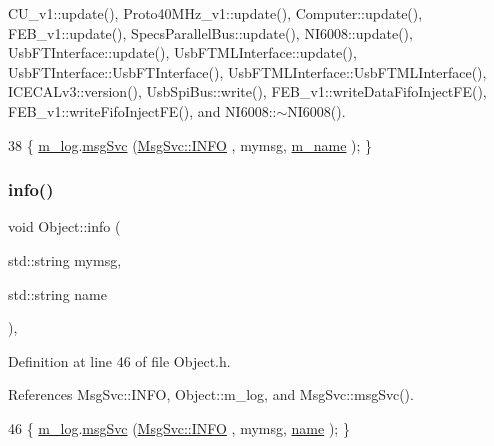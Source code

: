 C\+U\+\_\+v1\+::update(), Proto40\+M\+Hz\+\_\+v1\+::update(), Computer\+::update(), F\+E\+B\+\_\+v1\+::update(), Specs\+Parallel\+Bus\+::update(), N\+I6008\+::update(), Usb\+F\+T\+Interface\+::update(), Usb\+F\+T\+M\+L\+Interface\+::update(), Usb\+F\+T\+Interface\+::\+Usb\+F\+T\+Interface(), Usb\+F\+T\+M\+L\+Interface\+::\+Usb\+F\+T\+M\+L\+Interface(), I\+C\+E\+C\+A\+Lv3\+::version(), Usb\+Spi\+Bus\+::write(), F\+E\+B\+\_\+v1\+::write\+Data\+Fifo\+Inject\+F\+E(), F\+E\+B\+\_\+v1\+::write\+Fifo\+Inject\+F\+E(), and N\+I6008\+::$\sim$\+N\+I6008().


\begin{DoxyCode}
38 \{ \hyperlink{classObject_a0d269813dd7ac1f24bc143031e2963f2}{m\_log}.\hyperlink{classMsgSvc_ad25f18047920cc59a314e5098259711c}{msgSvc} (\hyperlink{classMsgSvc_ae671eb7301996cd049d2da8a65925926ad2fcf3f3e734fc41ee097cc23670ce51}{MsgSvc::INFO}    , mymsg, \hyperlink{classObject_a8b83c95c705d2c3ba0d081fe1710f48d}{m\_name} ); \}
\end{DoxyCode}
\mbox{\label{classObject_a1ca123253dfd30fc28b156f521dcbdae}} 
\subsubsection{\texorpdfstring{info()}{info()}\hspace{0.1cm}{\footnotesize\ttfamily [2/2]}}
{\footnotesize\ttfamily void Object\+::info (\begin{DoxyParamCaption}\item[{std\+::string}]{mymsg,  }\item[{std\+::string}]{name }\end{DoxyParamCaption})\hspace{0.3cm}{\ttfamily [inline]}, {\ttfamily [inherited]}}



Definition at line 46 of file Object.\+h.



References Msg\+Svc\+::\+I\+N\+FO, Object\+::m\+\_\+log, and Msg\+Svc\+::msg\+Svc().


\begin{DoxyCode}
46 \{ \hyperlink{classObject_a0d269813dd7ac1f24bc143031e2963f2}{m\_log}.\hyperlink{classMsgSvc_ad25f18047920cc59a314e5098259711c}{msgSvc} (\hyperlink{classMsgSvc_ae671eb7301996cd049d2da8a65925926ad2fcf3f3e734fc41ee097cc23670ce51}{MsgSvc::INFO}    , mymsg, \hyperlink{classObject_a300f4c05dd468c7bb8b3c968868443c1}{name} ); \}
\end{DoxyCode}
\mbox{\label{classMSOxxxx_ac14ed16b221798423e7c3b5e285006b5}} 

